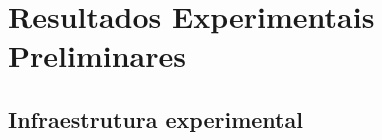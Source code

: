 \chapter{Resultados Experimentais Preliminares}
\label{cap:resultados}


\section{Infraestrutura experimental}
\label{sec:infraestrutura_experimental}



